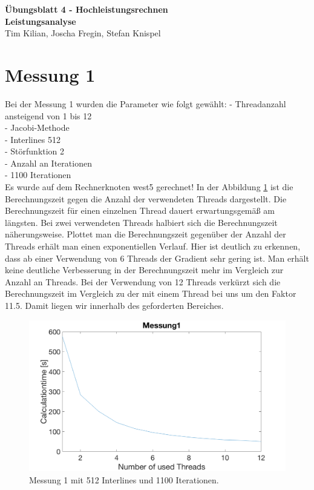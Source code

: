 \documentclass[11pt,a4paper]{article}
\begin{document}
\Large\textbf{{{\noindent Übungsblatt 4 - Hochleistungsrechnen\\}}}
\textbf{{Leistungsanalyse\\}}
Tim Kilian, Joscha Fregin, Stefan Knispel


\section{Messung 1}

Bei der Messung 1 wurden die Parameter wie folgt gewählt:
- Threadanzahl ansteigend von 1 bis 12 \\
- Jacobi-Methode \\
- Interlines 512 \\
- Störfunktion 2 \\
- Anzahl an Iterationen \\
- 1100 Iterationen \\
Es wurde auf dem Rechnerknoten west5 gerechnet!
\noindent In der Abbildung \ref{messung1} ist die Berechnungszeit gegen die Anzahl der verwendeten Threads dargestellt. Die Berechnungszeit für einen einzelnen Thread dauert erwartungsgemäß am längsten. Bei zwei verwendeten Threads halbiert sich die Berechnungszeit näherungsweise. 
Plottet man die Berechnungszeit gegenüber der Anzahl der Threads erhält man einen exponentiellen Verlauf. Hier ist deutlich zu erkennen, dass ab einer Verwendung von 6 Threads der Gradient sehr gering ist. Man erhält keine deutliche Verbesserung in der Berechnungszeit mehr im Vergleich zur Anzahl an Threads. 
Bei der Verwendung von 12 Threads verkürzt sich die Berechnungszeit im Vergleich zu der mit einem Thread bei uns um den Faktor 11.5. Damit liegen wir innerhalb des geforderten Bereiches.

\begin{figure}[htb]
\centering
\includegraphics[width=1.0\textwidth,angle=0]{Messung1.png}
\caption{Messung 1 mit 512 Interlines und 1100 Iterationen.}
\label{messung1}
\end{figure}
\end{document}
